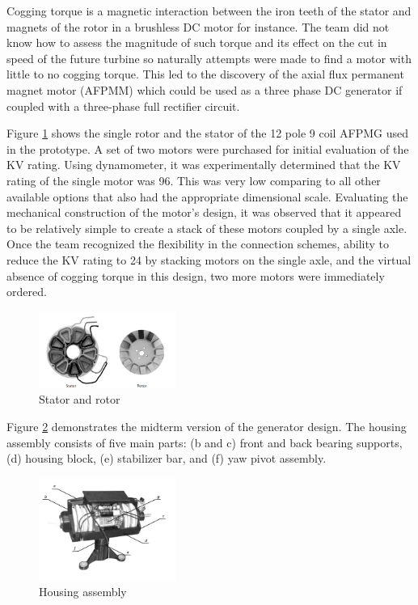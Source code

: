 \documentclass[../ewet_cwc_report.tex]{subfiles}
\begin{document}
Cogging torque is a magnetic interaction between the iron teeth
of the stator and magnets of the rotor in a brushless DC motor
for instance. The team did not know how to assess the magnitude
of such torque and its effect on the cut in speed of the future
turbine so naturally attempts were made to find a motor with
little to no cogging torque. This led to the discovery of the
axial flux permanent magnet motor (AFPMM) which could be used
as a three phase DC generator if coupled with a three-phase
full rectifier circuit.

Figure \ref{img:stator_rotor} shows the single rotor and the
stator of the 12 pole 9 coil AFPMG used in the prototype. A set
of two motors were purchased for initial evaluation of the KV
rating. Using dynamometer, it was experimentally determined
that the KV rating of the single motor was 96. This was very
low comparing to all other available options that also had the
appropriate dimensional scale. Evaluating the mechanical
construction of the motor's design, it was observed that it
appeared to be relatively simple to create a stack of these
motors coupled by a single axle. Once the team recognized the
flexibility in the connection schemes, ability to reduce the
KV rating to 24 by stacking motors on the single axle, and the
virtual absence of cogging torque in this design, two more
motors were immediately ordered.
\begin{figure}[th]
  \centering
  \includegraphics[width=0.4\textwidth]{../_images/stator_rotor.png}
  \caption{Stator and rotor}
  \label{img:stator_rotor}
\end{figure}

Figure \ref{img:housing} demonstrates the midterm version of
the generator design. The housing assembly consists of five
main parts: (b and c) front and back bearing supports,
(d) housing block, (e) stabilizer bar, and (f) yaw pivot
assembly.

\begin{figure}[th]
  \centering
  \includegraphics[width=0.4\textwidth]{../_images/housing.png}
  \caption{Housing assembly}
  \label{img:housing}
\end{figure}
\end{document}

